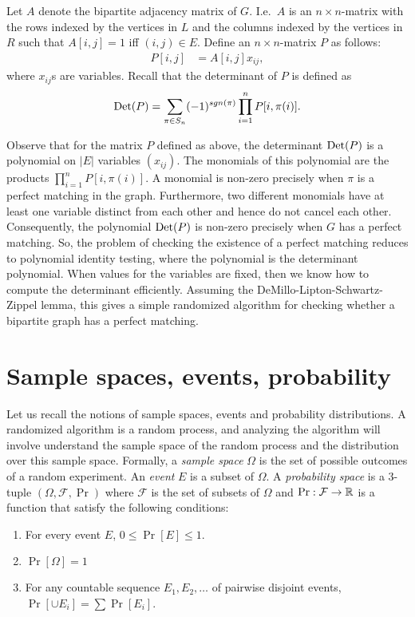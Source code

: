 Let $A$ denote the bipartite adjacency matrix of $G$. I.e.\ $A$ is an
$n\times n$-matrix with the rows indexed by the vertices in $L$ and the columns
indexed by the vertices in $R$ such that $A[i,j] = 1$ iff $(i,j)\in E$. Define
an $n\times n$-matrix $P$ as follows:
\begin{align*}
	P[i,j] &= A[i,j]x_{ij},
\end{align*}
where $x_{ij}$s are variables. Recall that the determinant of $P$ is defined as
\begin{align*}
	\operatorname{Det}(P) = \sum_{\pi \in S_n} (-1)^{sgn(\pi)} \prod_{i=1}^n P[i,\pi(i)].
\end{align*}

Observe that for the matrix $P$ defined as above, the determinant $\operatorname{Det}(P)$ is a
polynomial on $|E|$ variables $(x_{ij})$. The monomials of this polynomial are
the products $\prod_{i=1}^n P[i,\pi(i)]$. A monomial is non-zero precisely when
$\pi$ is a perfect matching in the graph. Furthermore, two different monomials
have at least one variable distinct from each other and hence do not cancel each
other. Consequently, the polynomial $\operatorname{Det}(P)$ is non-zero precisely when $G$ has
a perfect matching. So, the problem of checking the existence of a perfect
matching reduces to polynomial identity testing, where the polynomial is the
determinant polynomial. When values for the variables are fixed, then we know
how to compute the determinant efficiently. Assuming the
DeMillo-Lipton-Schwartz-Zippel lemma, this gives a simple randomized algorithm
for checking whether a bipartite graph has a perfect matching.
\section{Sample spaces, events, probability}

Let us recall the notions of sample spaces, events and probability distributions. A randomized algorithm is a random process, and analyzing the algorithm will involve understand the sample space of the random process and the distribution over this sample space. Formally, a \textit{sample space} $\Omega$ is the set of possible outcomes of a random experiment. An \textit{event} $E$ is a subset of $\Omega$. A \textit{probability space} is a $3$-tuple $(\Omega, \mathcal{F},\Pr)$ where $\mathcal{F}$ is the set of subsets of $\Omega$ and $\Pr:\mathcal{F} \to \mathbb{R}$ is a function that satisfy the following conditions:
\begin{enumerate}
	\item For every event $E$, $0 \leq \Pr[E] \leq 1$.
	\item $\Pr[\Omega] = 1$
	\item For any countable sequence $E_1, E_2, \ldots $ of pairwise disjoint events, $\Pr[\cup E_i] = \sum \Pr[E_i]$.
\end{enumerate}

